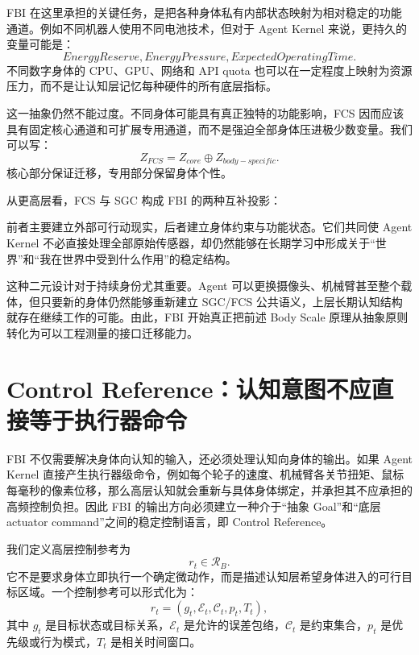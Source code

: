 FBI 在这里承担的关键任务，是把各种身体私有内部状态映射为相对稳定的功能通道。例如不同机器人使用不同电池技术，但对于 Agent Kernel 来说，更持久的变量可能是：
\[
EnergyReserve,
EnergyPressure,
ExpectedOperatingTime.
\]
不同数字身体的 CPU、GPU、网络和 API quota 也可以在一定程度上映射为资源压力，而不是让认知层记忆每种硬件的所有底层指标。

这一抽象仍然不能过度。不同身体可能具有真正独特的功能影响，FCS 因而应该具有固定核心通道和可扩展专用通道，而不是强迫全部身体压进极少数变量。我们可以写：
\[
Z_{FCS}
=
Z_{core}
\oplus
Z_{body-specific}.
\]
核心部分保证迁移，专用部分保留身体个性。

从更高层看，FCS 与 SGC 构成 FBI 的两种互补投影：
\begin{statementbox}
\centering
{}
\end{statementbox}
\begin{statementbox}
\centering
{}
\end{statementbox}
前者主要建立外部可行动现实，后者建立身体约束与功能状态。它们共同使 Agent Kernel 不必直接处理全部原始传感器，却仍然能够在长期学习中形成关于“世界”和“我在世界中受到什么作用”的稳定结构。

这种二元设计对于持续身份尤其重要。Agent 可以更换摄像头、机械臂甚至整个载体，但只要新的身体仍然能够重新建立 SGC/FCS 公共语义，上层长期认知结构就存在继续工作的可能。由此，FBI 开始真正把前述 Body Scale 原理从抽象原则转化为可以工程测量的接口迁移能力。


\section{Control Reference：认知意图不应直接等于执行器命令}

FBI 不仅需要解决身体向认知的输入，还必须处理认知向身体的输出。如果 Agent Kernel 直接产生执行器级命令，例如每个轮子的速度、机械臂各关节扭矩、鼠标每毫秒的像素位移，那么高层认知就会重新与具体身体绑定，并承担其不应承担的高频控制负担。因此 FBI 的输出方向必须建立一种介于“抽象 Goal”和“底层 actuator command”之间的稳定控制语言，即 Control Reference。

我们定义高层控制参考为
\[
r_t
\in
\mathcal R_B.
\]
它不是要求身体立即执行一个确定微动作，而是描述认知层希望身体进入的可行目标区域。一个控制参考可以形式化为：
\[
r_t
=
(
g_t,
\mathcal E_t,
\mathcal C_t,
p_t,
T_t
),
\]
其中 \(g_t\) 是目标状态或目标关系，\(\mathcal E_t\) 是允许的误差包络，\(\mathcal C_t\) 是约束集合，\(p_t\) 是优先级或行为模式，\(T_t\) 是相关时间窗口。

